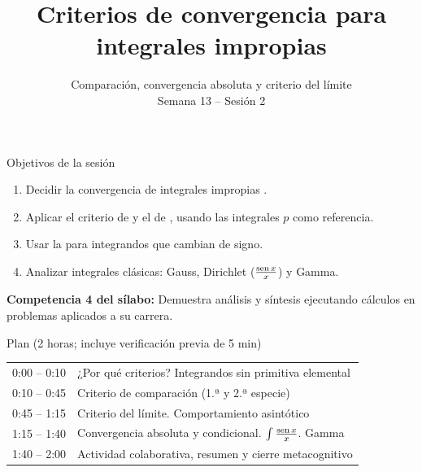 \documentclass[10pt,aspectratio=169]{beamer}
\title[Criterios para integrales impropias]{Criterios de convergencia para integrales impropias}
\subtitle{Comparación, convergencia absoluta y criterio del límite\\[2pt]\small Semana 13 -- Sesión 2}
\begin{document}
\begin{frame}
  \titlepage
\end{frame}

\begin{frame}{Objetivos de la sesión}
  \begin{enumerate}
    \item Decidir la convergencia de integrales impropias .
    \item Aplicar el criterio de  y el de , usando las integrales $p$ como referencia.
    \item Usar la  para integrandos que cambian de signo.
    \item Analizar integrales clásicas: Gauss, Dirichlet ($\frac{\operatorname{sen} x}{x}$) y Gamma.
  \end{enumerate}
  \vspace{1mm}
  {\small\textbf{Competencia 4 del sílabo:} Demuestra análisis y síntesis ejecutando cálculos en problemas aplicados a su carrera.}
  \begin{block}{Plan (2 horas; incluye verificación previa de 5 min)}
    \begin{tabular}{ll}
      0:00 -- 0:10 & ¿Por qué criterios? Integrandos sin primitiva elemental\\
      0:10 -- 0:45 & Criterio de comparación (1.ª y 2.ª especie)\\
      0:45 -- 1:15 & Criterio del límite. Comportamiento asintótico\\
      1:15 -- 1:40 & Convergencia absoluta y condicional. $\int\frac{\operatorname{sen} x}x$. Gamma\\
      1:40 -- 2:00 & Actividad colaborativa, resumen y cierre metacognitivo
    \end{tabular}
  \end{block}
\end{frame}
\end{document}
